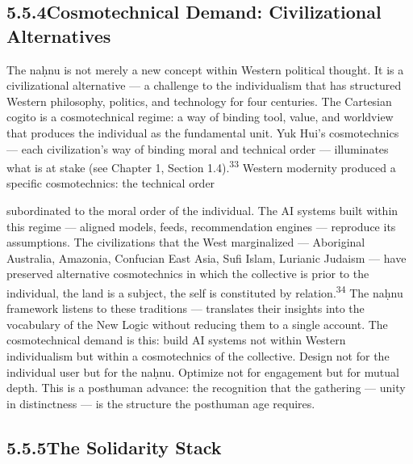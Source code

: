 \subsection{5.5.4\quad Cosmotechnical Demand: Civilizational Alternatives}

The naḥnu is not merely a new concept within Western political thought. It is a civilizational alternative — a challenge to the individualism that has structured Western philosophy, politics, and technology for four centuries. The Cartesian cogito is a cosmotechnical regime: a way of binding tool, value, and worldview that produces the individual as the fundamental unit. Yuk Hui’s cosmotechnics — each civilization’s way of binding moral and technical order — illuminates what is at stake (see Chapter 1, Section 1.4).\textsuperscript{33} Western modernity produced a specific cosmotechnics: the technical order

subordinated to the moral order of the individual. The AI systems built within this regime — aligned models, feeds, recommendation engines — reproduce its assumptions. The civilizations that the West marginalized — Aboriginal Australia, Amazonia, Confucian East Asia, Sufi Islam, Lurianic Judaism — have preserved alternative cosmotechnics in which the collective is prior to the individual, the land is a subject, the self is constituted by relation.\textsuperscript{34} The naḥnu framework listens to these traditions — translates their insights into the vocabulary of the New Logic without reducing them to a single account. The cosmotechnical demand is this: build AI systems not within Western individualism but within a cosmotechnics of the collective. Design not for the individual user but for the naḥnu. Optimize not for engagement but for mutual depth. This is a posthuman advance: the recognition that the gathering — unity in distinctness — is the structure the posthuman age requires.

\subsection{5.5.5\quad The Solidarity Stack}

